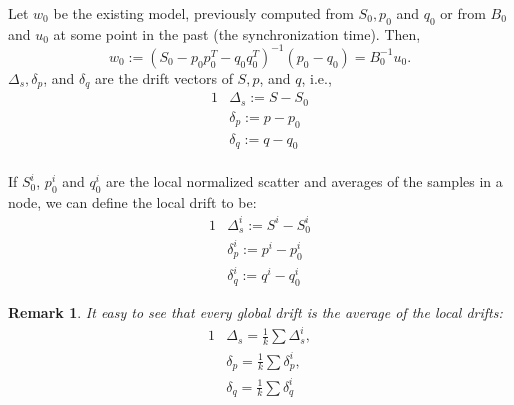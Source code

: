 \documentclass[11pt,twocolumn,varwidth=true,a4paper,fleqn]{article}
\newtheorem{remark}{Remark}
\begin{document}
Let $w_0$ be the existing model, previously computed from $S_0, p_0$ and $q_0$
or from $B_0$ and $u_0$ at some point in the past (the synchronization time).
Then,
\begin{equation*} 
w_0:=(S_0 - p_0p_0^T - q_0q_0^T)^{-1}(p_0-q_0)=B_0^{-1}u_0.
\end{equation*}
$\Delta_s, \delta_p$, and $\delta_q$ are the drift vectors of $S, p$, and $q$,
i.e.,
\begin{alignat*}{1}
& \Delta_s:= S - S_0 \\
& \delta_p:= p - p_0 \\
& \delta_q := q - q_0
\end{alignat*}
\\If $S_0^i$, $p_0^i$ and $q_0^i$ are the local normalized scatter and averages
of the samples in a node, we can define the local drift to be:
\begin{alignat*}{1}
& \Delta_s^i:= S^i - S_0^i
\\ & \delta_p^i:= p^i - p_0^i
\\ & \delta_q^i:= q^i - q_0^i
\end{alignat*}
\begin{remark} \label{average}
It easy to see that every global drift is the average of the local drifts:
\begin{alignat*}{1}
& \Delta_s = \frac{1}{k} \sum \Delta_s^i, \\
& \delta_p = \frac{1}{k} \sum \delta_p^i, \\
& \delta_q = \frac{1}{k} \sum \delta_q^i 
\end{alignat*}

\end{remark}
\end{document}
